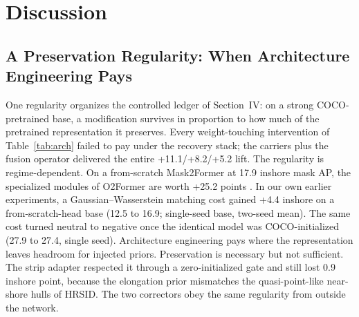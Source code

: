 
\section{Discussion}
\label{sec:discussion}

\subsection{A Preservation Regularity: When Architecture Engineering Pays}
\label{sec:disc-preservation}

One regularity organizes the controlled ledger of Section~IV: on a strong COCO-pretrained base, a modification survives in proportion to how much of the pretrained representation it preserves. Every weight-touching intervention of Table~\ref{tab:arch} failed to pay under the recovery stack; the carriers plus the fusion operator delivered the entire +11.1/+8.2/+5.2 lift. The regularity is regime-dependent. On a from-scratch Mask2Former at 17.9 inshore mask AP, the specialized modules of O2Former are worth +25.2 points \cite{o2former2025}. In our own earlier experiments, a Gaussian--Wasserstein matching cost gained +4.4 inshore on a from-scratch-head base (12.5 to 16.9; single-seed base, two-seed mean). The same cost turned neutral to negative once the identical model was COCO-initialized (27.9 to 27.4, single seed). Architecture engineering pays where the representation leaves headroom for injected priors. Preservation is necessary but not sufficient. The strip adapter respected it through a zero-initialized gate and still lost 0.9 inshore point, because the elongation prior mismatches the quasi-point-like near-shore hulls of HRSID. The two correctors obey the same regularity from outside the network.

